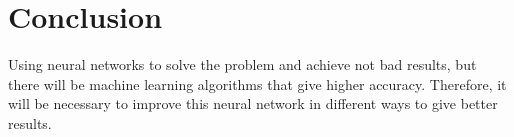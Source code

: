 \documentclass{article}
\begin{document}
\section{Conclusion}
Using neural networks to solve the problem and achieve not bad results, but there will be machine learning algorithms that give higher accuracy. Therefore, it will be necessary to improve this neural network in different ways to give better results.
% 

\label{sec:refs}

\end{document}
